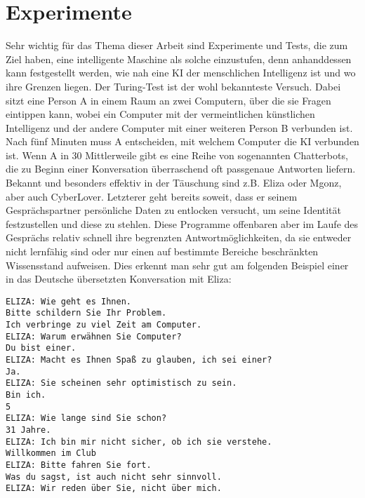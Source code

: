 \section{Experimente}
Sehr wichtig für das Thema dieser Arbeit sind Experimente und Tests, die zum Ziel haben, eine intelligente Maschine als solche einzustufen, denn anhanddessen kann festgestellt werden, wie nah eine KI der menschlichen Intelligenz ist und wo ihre Grenzen liegen.
Der Turing-Test ist der wohl bekannteste Versuch.
Dabei sitzt eine Person A in einem Raum an zwei Computern, über die sie Fragen eintippen kann, wobei ein Computer mit der vermeintlichen künstlichen Intelligenz und der andere Computer mit einer weiteren Person B verbunden ist.
Nach fünf Minuten muss A entscheiden, mit welchem Computer die KI verbunden ist.
Wenn A in 30%
Mittlerweile gibt es eine Reihe von sogenannten Chatterbots, die zu Beginn einer Konversation überraschend oft passgenaue Antworten liefern.
Bekannt und besonders effektiv in der Täuschung sind z.B.
Eliza oder Mgonz, aber auch CyberLover.
Letzterer geht bereits soweit, dass er seinem Gesprächspartner persönliche Daten zu entlocken versucht, um seine Identität festzustellen und diese zu stehlen.
Diese Programme offenbaren aber im Laufe des Gesprächs relativ schnell ihre begrenzten Antwortmöglichkeiten, da sie entweder nicht lernfähig sind oder nur einen auf bestimmte Bereiche beschränkten Wissensstand aufweisen.
Dies erkennt man sehr gut am folgenden Beispiel einer in das Deutsche übersetzten Konversation mit Eliza:

\begin{verbatim}
ELIZA: Wie geht es Ihnen.
Bitte schildern Sie Ihr Problem.
Ich verbringe zu viel Zeit am Computer.
ELIZA: Warum erwähnen Sie Computer?
Du bist einer.
ELIZA: Macht es Ihnen Spaß zu glauben, ich sei einer?
Ja.
ELIZA: Sie scheinen sehr optimistisch zu sein.
Bin ich.
5
ELIZA: Wie lange sind Sie schon?
31 Jahre.
ELIZA: Ich bin mir nicht sicher, ob ich sie verstehe.
Willkommen im Club
ELIZA: Bitte fahren Sie fort.
Was du sagst, ist auch nicht sehr sinnvoll.
ELIZA: Wir reden über Sie, nicht über mich.
\end{verbatim}

